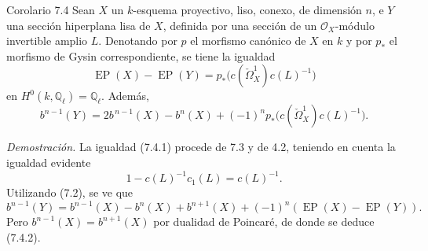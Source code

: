 \begin{statement}{Corolario 7.4}
Sean $X$ un $k$-esquema proyectivo, liso, conexo, de dimensión $n$, e $Y$ una sección hiperplana lisa de $X$, definida por una sección de un $\mathcal O_X$-módulo invertible amplio $L$. Denotando por $p$ el morfismo canónico de $X$ en $k$ y por $p_*$ el morfismo de Gysin correspondiente, se tiene la igualdad
\[
\operatorname{EP}(X)-\operatorname{EP}(Y)=p_*\bigl(c(\check\Omega_X^1)c(L)^{-1}\bigr)
\tag{7.4.1}
\]
en $H^0(k,\mathbb Q_\ell)=\mathbb Q_\ell$. Además,
\[
b^{n-1}(Y)=2b^{\,n-1}(X)-b^n(X)+(-1)^n p_*\bigl(c(\check\Omega_X^1)c(L)^{-1}\bigr).
\tag{7.4.2}
\]
\end{statement}

\emph{Demostración.} La igualdad (7.4.1) procede de 7.3 y de 4.2, teniendo en cuenta la igualdad evidente
\[
1-c(L)^{-1}c_1(L)=c(L)^{-1}.
\]
Utilizando (7.2), se ve que
\[
b^{n-1}(Y)=b^{n-1}(X)-b^n(X)+b^{n+1}(X)+(-1)^n(\operatorname{EP}(X)-\operatorname{EP}(Y)).
\]
Pero $b^{n-1}(X)=b^{n+1}(X)$ por dualidad de Poincaré, de donde se deduce (7.4.2).
